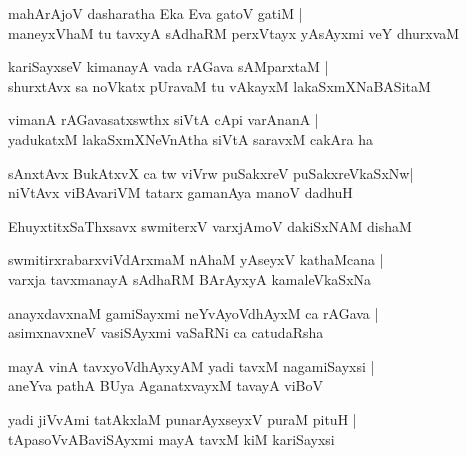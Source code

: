 \begin{shloka}
mahArAjoV dasharatha Eka Eva gatoV gatiM |\\
maneyxVhaM tu tavxyA sAdhaRM perxVtayx yAsAyxmi veY dhurxvaM 
\end{shloka}

\begin{shloka}
kariSayxseV kimanayA vada rAGava sAMparxtaM |\\
shurxtAvx sa noVkatx pUravaM tu vAkayxM lakaSxmXNaBASitaM 
\end{shloka}

\begin{shloka}
vimanA rAGavasatxswthx siVtA cApi varAnanA |\\
yadukatxM lakaSxmXNeVnAtha siVtA saravxM cakAra ha
\end{shloka}

\begin{shloka}
sAnxtAvx BukAtxvX ca tw viVrw puSakxreV puSakxreVkaSxNw|\\
niVtAvx viBAvariVM tatarx gamanAya manoV dadhuH 
\end{shloka}

\begin{shloka}
EhuyxtitxSaThxsavx swmiterxV varxjAmoV dakiSxNAM dishaM 
\end{shloka}

\begin{shloka}
swmitirxrabarxviVdArxmaM nAhaM yAseyxV kathaMcana |\\
varxja tavxmanayA sAdhaRM BArAyxyA kamaleVkaSxNa 
\end{shloka}

\begin{shloka}
anayxdavxnaM gamiSayxmi neYvAyoVdhAyxM ca rAGava |\\
asimxnavxneV vasiSAyxmi vaSaRNi ca catudaRsha
\end{shloka}

\begin{shloka}
mayA vinA tavxyoVdhAyxyAM yadi tavxM nagamiSayxsi |\\
aneYva pathA BUya AganatxvayxM tavayA viBoV
\end{shloka}

\begin{shloka}
yadi jiVvAmi tatAkxlaM punarAyxseyxV puraM pituH |\\
tApasoVvABaviSAyxmi mayA tavxM kiM kariSayxsi 
\end{shloka}

